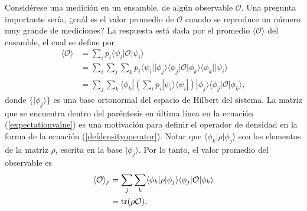 Considérese una medición en un ensamble, de algún observable $\mathcal{O}$. Una
pregunta importante sería, ¿cuál es el valor promedio de $\mathcal{O}$ cuando
se reproduce un número muy grande de mediciones? La respuesta está dada por el
promedio $\langle \mathcal{O} \rangle$ del ensamble, el cual se define por
{\cite{sakurai2017modern}} \begin{equation}
 	\label{expectationvalue}
 	 \begin{split}
 		\langle \mathcal{O} \rangle &= \sum_{i}p_i \langle\psi_i|\mathcal{O}|\psi_i\rangle\\
 		&=\sum_i\sum_{j}\sum_k p_i \langle\psi_i||\phi_j\rangle \langle \phi_j|\mathcal{O}|\phi_k\rangle \langle \phi_k||\psi_i\rangle\\
 		&=\sum_{j}\sum_k  \langle \phi_k| \left(\sum_{i} p_i |\psi_i\rangle  \langle\psi_i|\right)|\phi_j\rangle \langle \phi_j|\mathcal{O}|\phi_k\rangle, 
 	\end{split}
\end{equation} 
donde $\{|\phi_j\rangle \}$ es una base ortonormal 
del espacio de Hilbert del
sistema. La matriz que se encuentra dentro del paréntesis en última línea en la ecuación ({\ref{expectationvalue}}) es una motivación para  definir el operador de densidad  en la forma de la ecuación
({\ref{defdensityoperator}}). Notar que $\langle \phi_k| \rho|\phi_j\rangle$ son los elementos de la matriz $\rho$, escrita en la base $|\phi_j\rangle$. Por lo tanto, el valor promedio del observable es {\cite{sakurai2017modern}}\begin{equation}
	\label{expectationvalue_traza}
	\begin{split}
		\langle \mathcal{O} \rangle_{\rho} &=\sum_{j}\sum_k \langle \phi_k|\rho|\phi_j\rangle \langle \phi_j|\mathcal{O}|\phi_k\rangle\\
		&= \rm{tr}(\rho \mathcal{O}).
	\end{split}
\end{equation}

